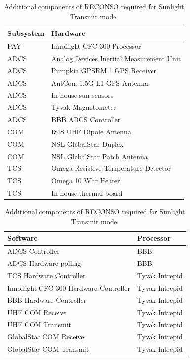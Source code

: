 \documentclass{article}
\begin{document}
\begin{table}[h!]
\caption{Additional components of RECONSO required for Sunlight Transmit mode.}
\begin{adjustbox}{center}
\begin{tabular}{|l|l|}
\hline
Subsystem & Hardware \\ \hline \hline
PAY & Innoflight CFC-300 Processor  \\ \hline \hline
ADCS & Analog Devices Inertial Measurement Unit  \\ \hline
ADCS & Pumpkin GPSRM 1 GPS Receiver \\ \hline
ADCS & AntCom 1.5G L1 GPS Antenna  \\ \hline
ADCS & In-house sun sensors  \\ \hline
ADCS & Tyvak Magnetometer \\ \hline
ADCS & BBB ADCS Controller \\ \hline \hline
COM & ISIS UHF Dipole Antenna  \\ \hline
COM & NSL GlobalStar Duplex  \\ \hline
COM & NSL GlobalStar Patch Antenna \\ \hline \hline
TCS & Omega Resistive Temperature Detector \\ \hline
TCS & Omega 10 Whr Heater  \\ \hline
TCS & In-house thermal board \\ \hline
\end{tabular}

\quad

\begin{tabular}{|l|l|}
\hline
Software & Processor \\ \hline \hline
ADCS Controller & BBB \\ \hline
ADCS Hardware polling & BBB \\ \hline \hline
TCS Hardware Controller & Tyvak Intrepid \\ \hline
Innoflight CFC-300 Hardware Controller & Tyvak Intrepid \\ \hline
BBB Hardware Controller & Tyvak Intrepid \\ \hline
UHF COM Receive & Tyvak Intrepid \\ \hline
UHF COM Transmit & Tyvak Intrepid \\ \hline
GlobalStar COM Receive & Tyvak Intrepid \\ \hline
GlobalStar COM Transmit & Tyvak Intrepid \\ \hline
\end{tabular}
\end{adjustbox}
\end{table}
\end{document}
